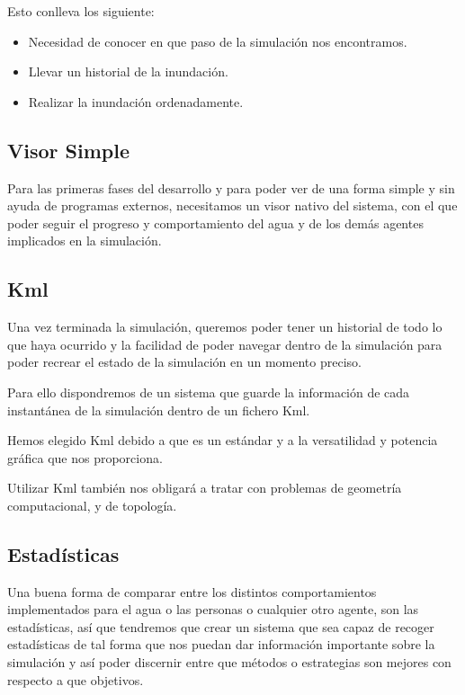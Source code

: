 Esto conlleva los siguiente:
\begin {itemize}
\item Necesidad de conocer en que paso de la simulación nos encontramos.
\item Llevar un historial de la inundación.
\item Realizar la inundación ordenadamente.
\end {itemize}

\subsection*{Visor Simple}
Para las primeras fases del desarrollo y para poder ver de una forma simple y
sin ayuda de programas externos, necesitamos un visor nativo del sistema, con
el que poder seguir el progreso y comportamiento del agua y de los demás
agentes implicados en la simulación.
\subsection*{Kml}

Una vez terminada la simulación, queremos poder tener un historial de todo lo
que haya ocurrido y la facilidad de poder navegar dentro de la simulación para
poder recrear el estado de la simulación en un momento preciso.

Para ello dispondremos de un sistema que guarde la información de cada
instantánea de la simulación dentro de un fichero Kml.

Hemos elegido Kml debido a que es un estándar y a la versatilidad y potencia
gráfica que nos proporciona.

Utilizar Kml también nos obligará a tratar con problemas de geometría
computacional, y de topología. 

\subsection*{Estadísticas}
Una buena forma de comparar entre los distintos comportamientos implementados
para el agua o las personas o cualquier otro agente, son las estadísticas, así
que tendremos que crear un sistema que sea capaz de recoger estadísticas de tal
forma que nos puedan dar información importante sobre la simulación y así poder
discernir entre que métodos o estrategias son mejores con respecto a que
objetivos.

